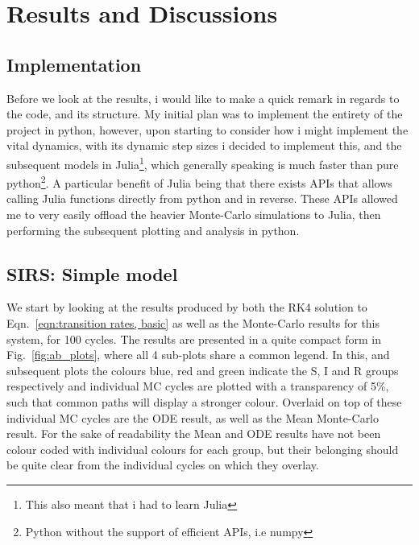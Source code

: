 \documentclass[10pt,showpacs,preprintnumbers,amsmath,amssymb,nofootinbib,aps,prl,twocolumn,groupedaddress,superscriptaddress,showkeys]{revtex4-1}
\begin{document}
\section{Results and Discussions}
  \subsection{Implementation}
    Before we look at the results, i would like to make a quick remark in regards to the code, and its structure. My initial plan was to implement the entirety of the project in python, however, upon starting to consider how i might implement the vital dynamics, with its dynamic step sizes i decided to implement this, and the subsequent models in Julia\footnote{This also meant that i had to learn Julia}, which generally speaking is much faster than pure python\footnote{Python without the support of efficient APIs, i.e numpy}. A particular benefit of Julia being that there exists APIs
    that allows calling Julia functions directly from python and in reverse. These APIs allowed me to very easily offload the heavier Monte-Carlo simulations to Julia, then performing the subsequent plotting and analysis in python. 

  \subsection{SIRS: Simple model}
    We start by looking at the results produced by both the RK4 solution to Eqn.~\ref{eqn:transition rates, basic} as well as the Monte-Carlo results for this system, for 100 cycles. The results are presented in a quite compact form in Fig.~\ref{fig:ab_plots}, where all 4 sub-plots share a common legend. In this, and subsequent plots the colours blue, red and green indicate the S, I and R groups respectively and individual MC cycles are plotted with a transparency of 5\%, such that common paths will display a stronger colour. Overlaid on top of these individual MC cycles are the ODE result, as well as the Mean Monte-Carlo result. For the sake of readability the Mean and ODE results have not been colour coded with individual colours for each group, but their belonging should be quite clear from the individual cycles on which they overlay.
\end{document}

